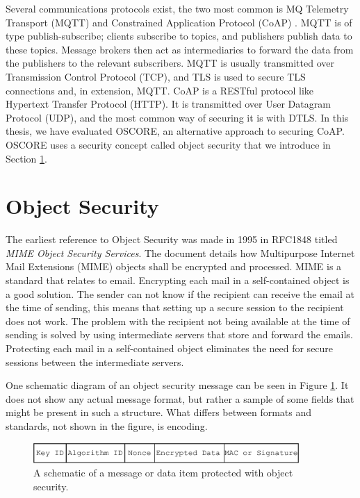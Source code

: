 Several communications protocols exist, the two most common is MQ Telemetry Transport (MQTT) \cite{hunkeler2008mqtt} and Constrained Application Protocol (CoAP) \cite{rfc7252}. MQTT is of type publish-subscribe; clients subscribe to topics, and publishers publish data to these topics. Message brokers then act as intermediaries to forward the data from the publishers to the relevant subscribers.
MQTT is usually transmitted over Transmission Control Protocol (TCP), and TLS is used to secure TLS connections and, in extension, MQTT.
CoAP is a RESTful protocol like Hypertext Transfer Protocol (HTTP). It is transmitted over User Datagram Protocol (UDP), and the most common way of securing it is with DTLS. In this thesis, we have evaluated OSCORE, an alternative approach to securing CoAP. OSCORE uses a security concept called object security that we introduce in Section \ref{sec:object_security}.

\section{Object Security}
\label{sec:object_security}
The earliest reference to Object Security was made in 1995 in RFC1848 \cite{RFC1848} titled \textit{MIME Object Security Services}. The document details how Multipurpose Internet Mail Extensions (MIME) objects shall be encrypted and processed. MIME is a standard that relates to email. Encrypting each mail in a self-contained object is a good solution. The sender can not know if the recipient can receive the email at the time of sending, this means that setting up a secure session to the recipient does not work. The problem with the recipient not being available at the time of sending is solved by using intermediate servers that store and forward the emails. Protecting each mail in a self-contained object eliminates the need for secure sessions between the intermediate servers.

One schematic diagram of an object security message can be seen in Figure \ref{fig:object-security}. It does not show any actual message format, but rather a sample of some fields that might be present in such a structure. What differs between formats and standards, not shown in the figure, is encoding. 

\begin{figure}[h]
\centering
\includegraphics[width=0.9\textwidth]{images/object_security.pdf}
\caption{A schematic of a message or data item protected with object security.}
\label{fig:object-security}
\end{figure}


